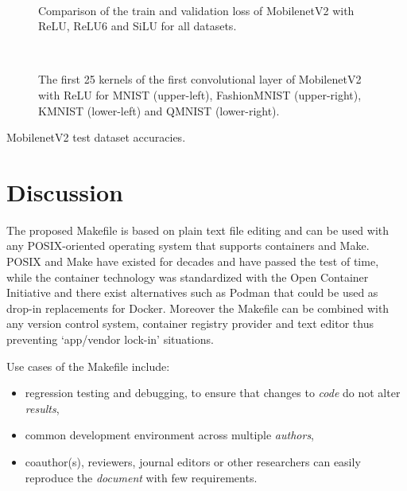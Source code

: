 \documentclass[journal]{IEEEtran}
\begin{document}
\begin{figure}[!t]
	\\
	\caption{Comparison of the train and validation loss of MobilenetV2 with ReLU, ReLU6 and SiLU for all datasets.}
	\label{fig:loss}
\end{figure}

\begin{figure}[!t]
	\\
	\caption{The first 25 kernels of the first convolutional layer of MobilenetV2 with ReLU for MNIST (upper-left), FashionMNIST (upper-right), KMNIST (lower-left) and QMNIST (lower-right).}
	\label{fig:kernels}
\end{figure}

\begin{table}[h]
	\centering
	\caption{MobilenetV2 test dataset accuracies.}
	\label{table:table}
	\setlength\tabcolsep{4pt}
	
\end{table}

\section{Discussion}
The proposed Makefile is based on plain text file editing and can be used with any POSIX-oriented operating system that supports containers and Make.
POSIX and Make have existed for decades and have passed the test of time, while the container technology was standardized with the Open Container Initiative and there exist alternatives such as Podman that could be used as drop-in replacements for Docker.
Moreover the Makefile can be combined with any version control system, container registry provider and text editor thus preventing `app/vendor lock-in' situations.

Use cases of the Makefile include:
\begin{itemize}
	\item regression testing and debugging, to ensure that changes to \textit{code} do not alter \textit{results},
	\item common development environment across multiple \textit{authors},
	\item coauthor(s), reviewers, journal editors or other researchers can easily reproduce the \textit{document} with few requirements.
\end{itemize}
\end{document}
